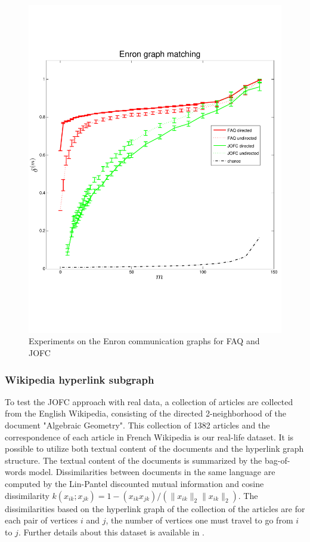 \documentclass[12pt,oneside,final]{thesis}\usepackage[]{graphicx}\usepackage[]{color}
\begin{document}
\begin{figure}
\includegraphics[scale=0.75]{enron-JOFC-FAQ-paper.pdf}
\caption{Experiments on the Enron communication graphs for FAQ and JOFC \label{enron_graphmatch_faq_jofc}}
\end{figure}

\subsubsection{Wikipedia hyperlink subgraph}

To test the JOFC approach with real data, a collection of articles are collected from the English Wikipedia, consisting of the
 directed 2-neighborhood of the document "Algebraic Geometry". 
   This  collection of 1382 articles and the correspondence of each article in French 
Wikipedia is our real-life dataset. It is possible to utilize both textual content of the documents and the hyperlink graph structure. The textual content of the documents is summarized by the bag-of-words model. Dissimilarities between documents  in the same language are computed by the Lin-Pantel discounted mutual information \cite{LinPantel,PantelLin}
 and cosine dissimilarity $k(x_{ik}; x_{jk}) = 1 - (x_{ik} x_{jk})/(\|x_{ik}\|_2\|x_{ik}\|_2)$. 
 The dissimilarities based on the hyperlink graph of the collection of the articles are 
 for each pair of vertices $i$ and $j$, the number of vertices one must travel to go from $i$ to $j$.  Further details about this dataset is available in \cite{Zhiliang_disparate}.
\end{document}
